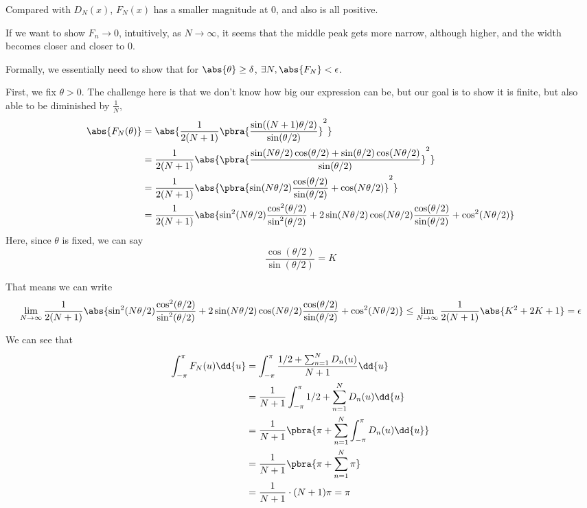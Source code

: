 {{Compared with $D_N(x)$, $F_N(x)$ has a smaller magnitude at $0$,
and also is all positive.

If we want to show $F_n \to 0$, intuitively, as $N \to \infty$,
it seems that the middle peak gets more narrow, although higher,
and the width becomes closer and closer to 0.

Formally, we essentially need to show that 
for $\abs{\theta} \geq \delta$, $\exists N, \abs{F_N} < \epsilon$.

First, we fix $\theta > 0$.
The challenge here is that we don't know how big 
our expression can be, but our goal is to show 
it is finite, but also able to be diminished by $\frac{1}{N}$,
\begin{align*}
  \abs{
    F_N(\theta)
  } &=
  \abs{
    \frac{
      1
    }{2(N+1)}
    \pbra{
      \frac{
        \sin((N+1)\theta/2)
      }{
        \sin(\theta/2)
      }
    }^2
  }\\
  &=
  \frac{
    1
  }{2(N+1)}
  \abs{
    \pbra{
      \frac{
        \sin(N\theta/2)\cos(\theta/2) + \sin(\theta/2)\cos(N\theta/2)
      }{
        \sin(\theta/2)
      }
    }^2
  }\\
  &=
  \frac{
    1
  }{2(N+1)}
  \abs{
    \pbra{
      \sin(N\theta/2)\frac{\cos(\theta/2)}{\sin(\theta/2)} + 
      \cos(N\theta/2)
    }^2
  }\\
  &=
  \frac{
    1
  }{2(N+1)}
  \abs{
    \sin^2(N\theta/2)\frac{\cos^2(\theta/2)}{\sin^2(\theta/2)} + 
    2\sin(N\theta/2)\cos(N\theta/2)\frac{\cos(\theta/2)}{\sin(\theta/2)} + 
    \cos^2(N\theta/2)
  }
\end{align*}
Here, since $\theta$ is fixed, we can say
\begin{equation*}
  \frac{
    \cos(\theta/2)
  }{
    \sin(\theta/2)
  } = K
\end{equation*}

That means we can write
\begin{equation*}
  \lim_{N\to\infty}
  \frac{
    1
  }{2(N+1)}
  \abs{
    \sin^2(N\theta/2)\frac{\cos^2(\theta/2)}{\sin^2(\theta/2)} + 
    2\sin(N\theta/2)\cos(N\theta/2)\frac{\cos(\theta/2)}{\sin(\theta/2)} + 
    \cos^2(N\theta/2)
  }
  \leq
  \lim_{N\to\infty}
  \frac{
    1
  }{2(N+1)}
  \abs{
    K^2 + 
    2K +
    1
  } = \epsilon
\end{equation*}

\item We can see that 
\begin{align*}
  \int_{-\pi}^\pi F_N(u) \dd{u}
  &=
  \int_{-\pi}^\pi
  \frac{
    1/2 + \sum_{n=1}^N D_n(u)
  }{
    N+1
  }
  \dd{u}\\
  &=
  \frac{ 1 }{ N+1 }
  \int_{-\pi}^\pi
    1/2 + \sum_{n=1}^N D_n(u)
  \dd{u}\\
  &=
  \frac{ 1 }{ N+1 }\pbra{
    \pi + 
    \sum_{n=1}^N \int_{-\pi}^\pi D_n(u) \dd{u}
  }\\
  &=
  \frac{ 1 }{ N+1 }\pbra{
    \pi + 
    \sum_{n=1}^N \pi
  }\\
  &= \frac{1}{N+1} \cdot (N+1)\pi = \pi
\end{align*}

}}

